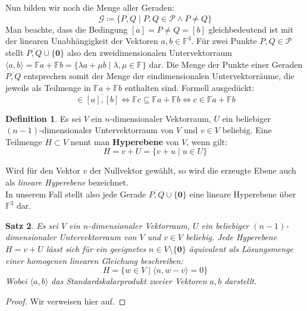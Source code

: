 \documentclass[hidelinks]{article}
\theoremstyle{plain}
\newtheorem{thm}{Satz}[section]
\theoremstyle{definition}
\newtheorem{defn}[thm]{Definition}
\theoremstyle{rem}
\begin{document}
\begin{sloppypar}
Nun bilden wir noch die Menge aller Geraden:
\begin{equation*}
	\mathcal{G}\coloneqq\{\overline{P,Q}\mid P,Q\in\mathcal{P}\land P\ne Q\}
\end{equation*}
Man beachte, dass die Bedingung $[a]=P\ne Q=[b]$ gleichbedeutend ist mit der linearen Unabhängigkeit der Vektoren $a,b\in\mathbb{F}^3$. Für zwei Punkte $P,Q\in\mathcal{P}$ stellt $\overline{P,Q}\cup\{\boldsymbol 0\}$ also den zweidimensionalen Untervektorraum $\langle a,b\rangle=\mathbb{F}a+\mathbb{F}b=\{\lambda a+\mu b\mid \lambda,\mu\in\mathbb{F}\}$ dar. 
Die Menge der Punkte einer Geraden $\overline{P,Q}$ entsprechen somit der Menge der eindimensionalen Untervektorräume, die jeweils als Teilmenge in $\mathbb{F}a+\mathbb{F}b$ enthalten sind. Formell ausgedückt:
\begin{equation*}
	[c]\in\overline{[a],[b]}\Leftrightarrow \mathbb{F}c\subseteq\mathbb{F}a+\mathbb{F}b\Leftrightarrow c\in\mathbb{F}a+\mathbb{F}b
\end{equation*}
\begin{defn}
	Es sei $V$ ein $n$-dimensionaler Vektorraum, $U$ ein beliebiger \mbox{$(n-1)$-dimensionaler} Untervektorraum von $V$ und $v\in V$ beliebig. Eine Teilmenge $H\subset V$ nennt man \textbf{Hyperebene} von $V$, wenn gilt:
\begin{equation*}
	H=v+U=\{v+u\mid u\in U\} 
\end{equation*}
\end{defn}
Wird für den Vektor $v$ der Nullvektor gewählt, so wird die erzeugte Ebene auch als \textit{lineare Hyperebene} bezeichnet.\\
In unserem Fall stellt also jede Gerade $\overline{P,Q}\cup\{\boldsymbol 0\}$ eine lineare Hyperebene über $\mathbb{F}^3$ dar.
\begin{thm}\label{hyperebene}
Es sei $V$ ein $n$-dimensionaler Vektorraum, $U$ ein beliebiger $(n-1)$-dimensionaler Untervektorraum von $V$ und $v\in V$ beliebig. 
Jede Hyperebene $H=v+U$ lässt sich für ein geeignetes $n\in V\setminus\{\boldsymbol 0\}$ äquivalent als Lösungsmenge einer homogenen linearen Gleichung beschreiben:
\begin{equation*}
	H=\{w\in V\mid \langle n,w-v\rangle=0\}
\end{equation*}
Wobei $\langle a,b\rangle$ das Standardskalarprodukt zweier Vektoren $a,b$ darstellt.
\end{thm}
\begin{proof}
	Wir verweisen hier auf\cite[Seite~189]{linalg}.
\end{proof}

\end{sloppypar}
\end{document}
